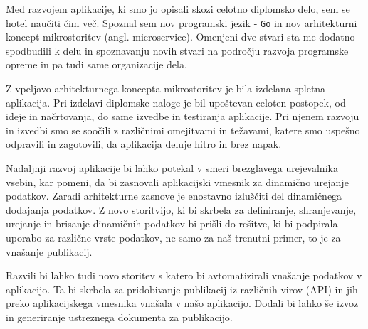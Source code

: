 \documentclass[a4paper, 12pt]{book}
\begin{document}
Med razvojem aplikacije, ki smo jo opisali skozi celotno diplomsko delo, sem se hotel naučiti čim več. Spoznal sem nov programski jezik - \verb=Go= in nov arhitekturni koncept mikrostoritev (angl. microservice). Omenjeni dve stvari sta me dodatno spodbudili k delu in spoznavanju novih stvari na področju razvoja programske opreme in pa tudi same organizacije dela.

Z vpeljavo arhitekturnega koncepta mikrostoritev je bila izdelana spletna aplikacija. Pri izdelavi diplomske naloge je bil upoštevan celoten postopek, od ideje in načrtovanja, do same izvedbe in testiranja aplikacije. Pri njenem razvoju in izvedbi smo se soočili z različnimi omejitvami in težavami, katere smo uspešno odpravili in zagotovili, da aplikacija deluje hitro in brez napak. 

Nadaljnji razvoj aplikacije bi lahko potekal v smeri brezglavega urejevalnika vsebin, kar pomeni, da bi zasnovali aplikacijski vmesnik za dinamično urejanje podatkov. Zaradi arhitekturne zasnove je enostavno izluščiti del dinamičnega dodajanja podatkov. Z novo storitvijo, ki bi skrbela za definiranje, shranjevanje, urejanje in brisanje dinamičnih podatkov bi prišli do rešitve, ki bi podpirala uporabo za različne vrste podatkov, ne samo za naš trenutni primer, to je za vnašanje publikacij. 

Razvili bi lahko tudi novo storitev s katero bi avtomatizirali vnašanje podatkov v aplikacijo. Ta bi skrbela za pridobivanje publikacij iz različnih virov (API) in jih preko aplikacijskega vmesnika vnašala v našo aplikacijo. Dodali bi lahko še izvoz in generiranje ustreznega dokumenta za publikacijo.

\clearpage
{}


\end{document}
